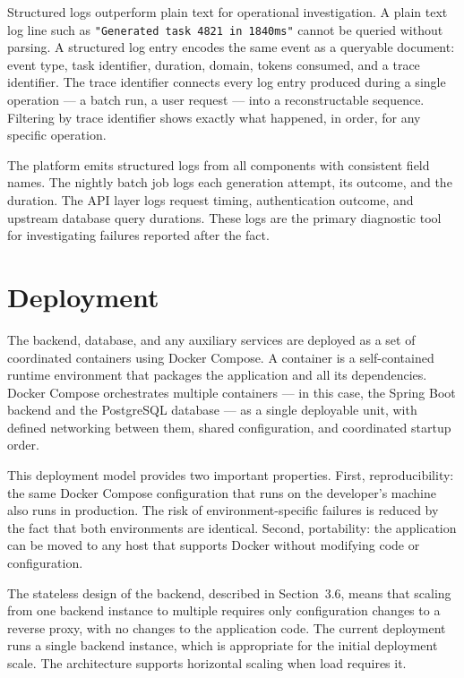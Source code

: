 Structured logs outperform plain text for operational investigation. A plain text log line such as \texttt{"Generated task 4821 in 1840ms"} cannot be queried without parsing. A structured log entry encodes the same event as a queryable document: event type, task identifier, duration, domain, tokens consumed, and a trace identifier. The trace identifier connects every log entry produced during a single operation --- a batch run, a user request --- into a reconstructable sequence. Filtering by trace identifier shows exactly what happened, in order, for any specific operation.

The platform emits structured logs from all components with consistent field names. The nightly batch job logs each generation attempt, its outcome, and the duration. The API layer logs request timing, authentication outcome, and upstream database query durations. These logs are the primary diagnostic tool for investigating failures reported after the fact.

\section{Deployment}

The backend, database, and any auxiliary services are deployed as a set of coordinated containers using Docker Compose. A container is a self-contained runtime environment that packages the application and all its dependencies. Docker Compose orchestrates multiple containers --- in this case, the Spring Boot backend and the PostgreSQL database --- as a single deployable unit, with defined networking between them, shared configuration, and coordinated startup order.

This deployment model provides two important properties. First, reproducibility: the same Docker Compose configuration that runs on the developer's machine also runs in production. The risk of environment-specific failures is reduced by the fact that both environments are identical. Second, portability: the application can be moved to any host that supports Docker without modifying code or configuration.

The stateless design of the backend, described in Section~3.6, means that scaling from one backend instance to multiple requires only configuration changes to a reverse proxy, with no changes to the application code. The current deployment runs a single backend instance, which is appropriate for the initial deployment scale. The architecture supports horizontal scaling when load requires it.

